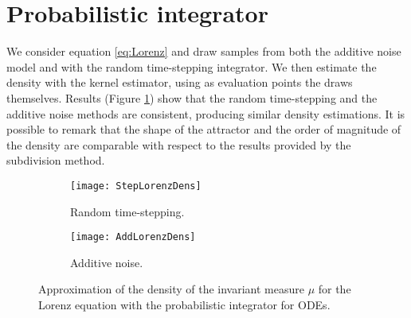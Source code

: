 \documentclass{siamart1116}
\numberwithin{theorem}{section}
\begin{document}
\section{Probabilistic integrator} We consider equation \eqref{eq:Lorenz} and draw samples from both the additive noise model \cite{CGS16} and with the random time-stepping integrator. We then estimate the density with the kernel estimator, using as evaluation points the draws themselves. Results (Figure \ref{fig:LorenzStepAdd}) show that the random time-stepping and the additive noise methods are consistent, producing similar density estimations. It is possible to remark that the shape of the attractor and the order of magnitude of the density are comparable with respect to the results provided by the subdivision method.
 
\begin{figure}[t]
	\begin{center} 
		\begin{subfigure}[b]{0.49\textwidth}
			\texttt{[image: StepLorenzDens]}
			\caption{Random time-stepping.}
		\end{subfigure}	
		\begin{subfigure}[b]{0.49\textwidth}
			\texttt{[image: AddLorenzDens]}
			\caption{Additive noise.}
		\end{subfigure} 
	\end{center}
	\caption{Approximation of the density of the invariant measure $\mu$ for the Lorenz equation with the probabilistic integrator for ODEs.}
	\label{fig:LorenzStepAdd}
\end{figure}



\end{document}
